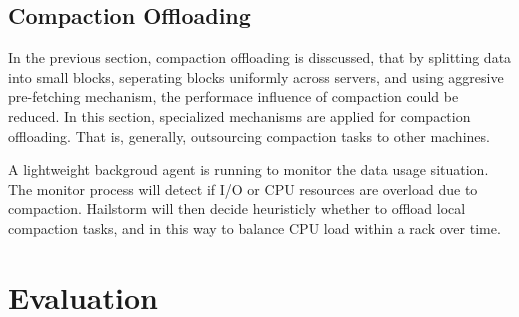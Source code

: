 \documentclass[a4paper,10pt,twoside]{article}
\begin{document}
\subsection{Compaction Offloading}
\par
In the previous section, compaction offloading is disscussed, that by splitting data into small blocks, seperating blocks uniformly across servers, 
and using aggresive pre-fetching mechanism, the performace influence of compaction could be reduced.
In this section, specialized mechanisms are applied for compaction offloading.
That is, generally, outsourcing compaction tasks to other machines.
\par
A lightweight backgroud agent is running to monitor the data usage situation. 
The monitor process will detect if I/O or CPU resources are overload due to compaction.
Hailstorm will then decide heuristicly whether to offload local compaction tasks, and in this way to balance CPU load within a rack over time.


\section{Evaluation}
\end{document}
